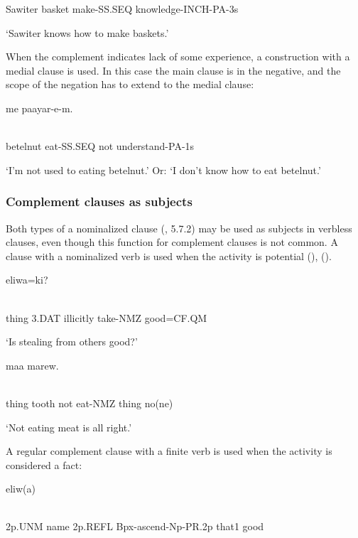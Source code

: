 Sawiter  basket  make-SS.SEQ  knowledge-INCH-PA-3s

`Sawiter knows how to make baskets.'

When the complement indicates lack of some experience, a construction with a medial clause is used. In this case the main clause is in the negative, and the scope of the negation has to extend to the medial clause:

\ea%
\label{ex:x1604}
\gll [Owora  en-ep]  me  paayar-e-m. \\
      \\
\glt
\z

betelnut  eat-SS.SEQ  not  understand-PA-1s

`I'm not used to eating betelnut.' Or: `I don't know how to eat betelnut.'

\subsubsection[Complement clauses as subjects]{Complement clauses as subjects}
\hypertarget{RefHeading23601935131865}{}
Both types of a nominalized clause (, 5.7.2) may be used as subjects in verbless clauses, even though this function for complement clauses is not common. A clause with a nominalized verb is used when the activity is potential (), (). 

\ea%
\label{ex:x1636}
  eliwa=ki? \\
      \\
\glt
\z

thing  3.DAT  illicitly  take-NMZ  good=CF.QM

`Is stealing from others good?'

\ea%
\label{ex:x1637}
  maa  marew. \\
      \\
\glt
\z

thing  tooth  not  eat-NMZ  thing  no(ne)

`Not eating meat is all right.'

A regular complement clause with a finite verb is used when the activity is considered a fact:

\ea%
\label{ex:x1639}
  eliw(a) \\
      \\
\glt
\z

2p.UNM  name  2p.REFL  Bpx-ascend-Np-PR.2p  that1  good

